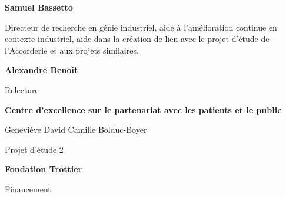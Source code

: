 %

%

\textbf{Samuel Bassetto}

Directeur de recherche en génie industriel, aide à l’amélioration continue en contexte industriel, aide dans la création de lien avec le projet d’étude de l’Accorderie et aux projets similaires.

\textbf{Alexandre Benoit}

Relecture



\textbf{Centre d'excellence sur le partenariat avec les patients et le public}

Geneviève David
Camille Bolduc-Boyer

Projet d’étude 2

\textbf{Fondation Trottier}

Financement

